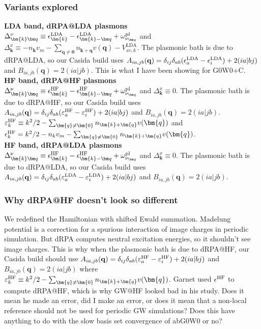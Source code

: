 \begin{frame}
    \frametitle{Variants explored}
\textbf{LDA band, dRPA@LDA plasmons}\\
$\Delta_{\bm{k}\bm q}^{\nu}
\equiv
\epsilon_{\bm{k}}^{\rm LDA}
-\epsilon_{\bm{k}-\bm q}^{\rm LDA}
+\omega_{\nu_{\bm q}}^{\rm pl}$ and $\Delta_{\bm{k}}^x\equiv -n_{\bm k}v_m-\sum_{\bm q\neq\bm 0}n_{\bm k+\bm q}v(\bm q)-V_{x c, k}^{\mathrm{LDA}}$. \pause The plasmonic bath is due to dRPA@LDA, so our Casida build uses $A_{ia,jb}(\mathbf{q}) = \delta_{ij} \delta_{ab} (\epsilon_a^{\rm LDA} - \epsilon_i^{\rm LDA}) + 2 (ia|bj)$ and $B_{ia,jb}(\mathbf{q}) = 2 (ia|jb)$. \pause This is what I have been showing for G0W0+C. \\ \pause
\textbf{HF band, dRPA@HF plasmons}\\
$\Delta_{\bm{k}\bm q}^{\nu}
\equiv
\epsilon_{\bm{k}}^{\rm HF}
-\epsilon_{\bm{k}-\bm q}^{\rm HF}
+\omega_{\nu_{\bm q}}^{\rm pl}$ and $\Delta_{\bm{k}}^x\equiv 0$. \pause The plasmonic bath is due to dRPA@HF, so our Casida build uses $A_{ia,jb}(\mathbf{q}) = \delta_{ij} \delta_{ab} (\varepsilon_a^{\rm HF} - \varepsilon_i^{\rm HF}) + 2 (ia|bj)$ and $B_{ia,jb}(\mathbf{q}) = 2 (ia|jb)$. \pause $\varepsilon_k^{\rm HF}\equiv k^2/2 -\sum_{\bm{q}\neq\bm{0}} n_{\bm{k}+\bm{q}} v(\bm{q})$ and $\epsilon_k^{\rm HF} = k^2/2 - n_{k}v_m-\sum_{\bm{q}\neq\bm{0}} n_{\bm{k}+\bm{q}}v(\bm{q})$.\\ \pause
\textbf{HF band, dRPA@LDA plasmons}\\
$\Delta_{\bm{k}\bm q}^{\nu}
\equiv
\epsilon_{\bm{k}}^{\rm HF}
-\epsilon_{\bm{k}-\bm q}^{\rm HF}
+\omega_{\nu_{\bm q}}^{\rm pl}$ and $\Delta_{\bm{k}}^x\equiv 0$. \pause The plasmonic bath is due to dRPA@LDA, so our Casida build uses $A_{ia,jb}(\mathbf{q}) = \delta_{ij} \delta_{ab} (\varepsilon_a^{\rm LDA} - \varepsilon_i^{\rm LDA}) + 2 (ia|bj)$ and $B_{ia,jb}(\mathbf{q}) = 2 (ia|jb)$.
\end{frame}
\begin{frame}
    \frametitle{Why dRPA@HF doesn't look so different}
We redefined the Hamiltonian with shifted Ewald summation. \pause Madelung potential is a correction for a spurious interaction of image charges in periodic simulation. \pause But dRPA computes neutral excitation energies, so it shouldn't see image charges. \pause This is why when the plasmonic bath is due to dRPA@HF, our Casida build should use $A_{ia,jb}(\mathbf{q}) = \delta_{ij} \delta_{ab} (\varepsilon_a^{\rm HF} - \varepsilon_i^{\rm HF}) + 2 (ia|bj)$ and $B_{ia,jb}(\mathbf{q}) = 2 (ia|jb)$ where $\varepsilon_k^{\rm HF}\equiv k^2/2 -\sum_{\bm{q}\neq\bm{0}} n_{\bm{k}+\bm{q}} v(\bm{q})$. \pause Garnet used $\epsilon^{\rm HF}$ to compute dRPA@HF, which is why GW@HF looked bad in his study. \pause Does it mean he made an error, did I make an error, or does it mean that a non-local reference should not be used for periodic GW simulations? \pause Does this have anything to do with the slow basis set convergence of abG0W0 or no?
\end{frame}
